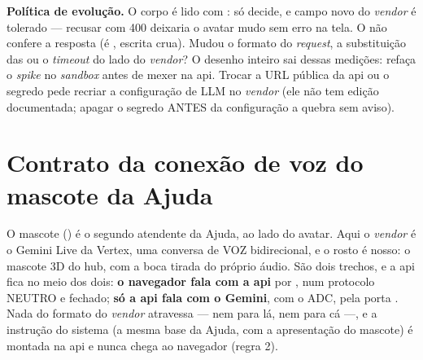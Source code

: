 \textbf{Política de evolução.} O corpo é lido com : só
 decide, e campo novo do \emph{vendor} é tolerado --- recusar com 400
deixaria o avatar mudo sem erro na tela. O  não confere a
resposta (é , escrita crua). Mudou o formato do
\emph{request}, a substituição das  ou o \emph{timeout} do
lado do \emph{vendor}? O desenho inteiro sai dessas medições: refaça o
\emph{spike} no \emph{sandbox} antes de mexer na api. Trocar a URL pública da api
ou o segredo pede recriar a configuração de LLM no \emph{vendor} (ele não tem
edição documentada; apagar o segredo ANTES da configuração a quebra sem aviso).

\section{Contrato da conexão de voz do mascote da Ajuda}
\label{sec:contrato-ajuda-mascote}

O mascote () é o segundo atendente da Ajuda, ao lado do avatar.
Aqui o \emph{vendor} é o Gemini Live da Vertex, uma conversa de VOZ bidirecional,
e o rosto é nosso: o mascote 3D do hub, com a boca tirada do próprio áudio. São
dois trechos, e a api fica no meio dos dois: \textbf{o navegador fala com a api}
por , num protocolo NEUTRO e fechado; \textbf{só
a api fala com o Gemini}, com o ADC, pela porta . Nada do
formato do \emph{vendor} atravessa --- nem para lá, nem para cá ---, e a
instrução do sistema (a mesma base da Ajuda, com a apresentação do mascote) é
montada na api e nunca chega ao navegador (regra 2).

